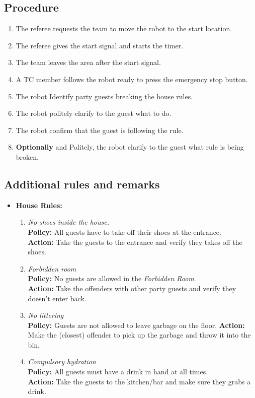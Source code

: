 \subsection*{Procedure}
	\begin{enumerate}[nosep]
		\item The referee requests the team to move the robot to the start location.
		\item The referee gives the start signal and starts the timer.
		\item The team leaves the area after the start signal.		
		\item A TC member follows the robot ready to press the emergency stop button.
		\item The robot Identify party guests breaking the house rules.
		\item The robot politely clarify to the guest what to do. 
		\item The robot confirm that the guest is following the rule.	
		\item \textbf{Optionally} and Politely, the robot clarify to the guest what rule is being broken.
	\end{enumerate}


\subsection*{Additional rules and remarks}
\begin{itemize}[nosep]
	\item \textbf{House Rules:}
	\begin{enumerate}[nosep]
		\item \textit{No shoes inside the house.}\\
		\textbf{Policy:} All guests have to take off their shoes at the entrance.\\
		\textbf{Action:} Take the guests to the entrance and verify they takes off the shoes.
	
		\item \textit{Forbidden room}\\
		\textbf{Policy:} No guests are allowed in the \emph{Forbidden Room}. \\
		\textbf{Action:} Take the offenders with other party guests and verify they doesn't enter back.
	
		\item \textit{No littering}\\
		\textbf{Policy:} Guests are not allowed to leave garbage on the floor.
		\textbf{Action:} Make the (closest) offender to pick up the garbage and throw it into the bin.
	
		\item \textit{Compulsory hydration}\\
		\textbf{Policy:} All guests must have a drink in hand at all times.\\
		\textbf{Action:} Take the guests to the kitchen/bar and make sure they grabs a drink.
	\end{enumerate}
\end{itemize}

